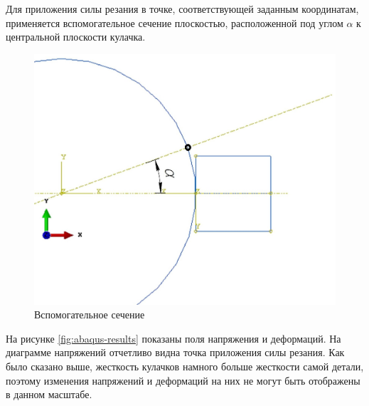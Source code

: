\documentclass[14pt,oneside,final]{extreport}
\begin{document}
	Для приложения силы резания в точке, соответствующей заданным координатам, применяется вспомогательное сечение 	плоскостью, расположенной под углом $ \alpha $ к центральной плоскости кулачка. 
	 
	\begin{figure}[!h]
		\begin{center}
			\includegraphics[scale=0.5]{img/modelPlane} 
		\end{center}
		\caption{Вспомогательное сечение}
		\label{fig:model-plane}
	\end{figure} 
	 
	На рисунке  \ref{fig:abaqus-results} показаны поля напряжения и деформаций. На диаграмме напряжений отчетливо видна точка приложения силы резания. Как было сказано выше, жесткость кулачков намного больше жесткости самой детали, поэтому изменения напряжений и деформаций на них не могут быть отображены в данном масштабе.  
	
\end{document}
